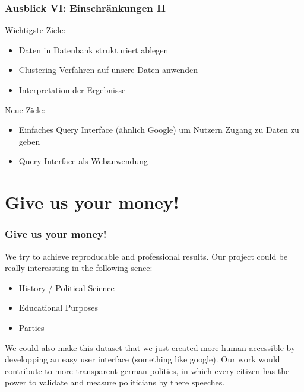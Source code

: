 \documentclass[11pt, a4paper]{beamer}
\begin{document}
\begin{frame}
\frametitle{Ausblick VI: Einschränkungen II}

Wichtigste Ziele:
\begin{itemize}
	\item Daten in Datenbank strukturiert ablegen
	\item Clustering-Verfahren auf unsere Daten anwenden
	\item Interpretation der Ergebnisse
\end{itemize}

Neue Ziele:
\begin{itemize}
	\item Einfaches Query Interface (ähnlich Google) um Nutzern Zugang zu Daten zu
	geben
	\item Query Interface als Webanwendung 
\end{itemize}
\end{frame}

\section{Give us your money!}
\begin{frame}
\frametitle{Give us your money!}
We try to achieve reproducable and professional results. Our project could be
really interessting in the following sence:
\begin{itemize}
\item History / Political Science  
\item Educational Purposes
\item Parties 
\end{itemize}
We could also make this dataset that we just created more human accessible by 
developping an easy user interface (something like google).
Our work would contribute to more transparent german politics, in which every 
citizen has the power to validate and measure politicians by there speeches.
\end{frame}

\printbibliography
\end{document}

